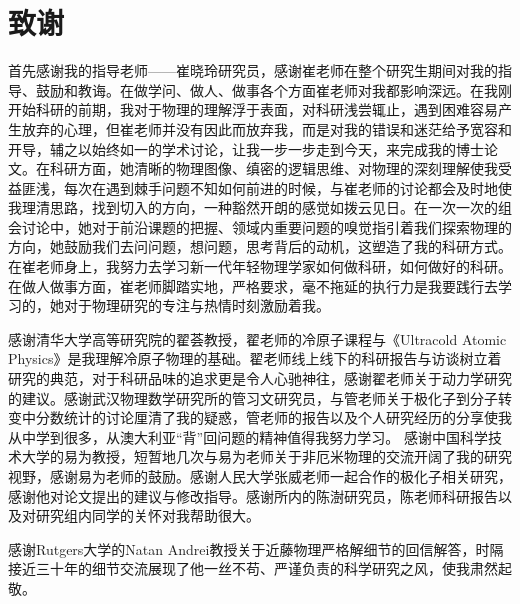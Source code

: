\chapter[致谢]{致\quad 谢}%

首先感谢我的指导老师——崔晓玲研究员，感谢崔老师在整个研究生期间对我的指导、鼓励和教诲。在做学问、做人、做事各个方面崔老师对我都影响深远。在我刚开始科研的前期，我对于物理的理解浮于表面，对科研浅尝辄止，遇到困难容易产生放弃的心理，但崔老师并没有因此而放弃我，而是对我的错误和迷茫给予宽容和开导，辅之以始终如一的学术讨论，让我一步一步走到今天，来完成我的博士论文。在科研方面，她清晰的物理图像、缜密的逻辑思维、对物理的深刻理解使我受益匪浅，每次在遇到棘手问题不知如何前进的时候，与崔老师的讨论都会及时地使我理清思路，找到切入的方向，一种豁然开朗的感觉如拨云见日。在一次一次的组会讨论中，她对于前沿课题的把握、领域内重要问题的嗅觉指引着我们探索物理的方向，她鼓励我们去问问题，想问题，思考背后的动机，这塑造了我的科研方式。在崔老师身上，我努力去学习新一代年轻物理学家如何做科研，如何做好的科研。在做人做事方面，崔老师脚踏实地，严格要求，毫不拖延的执行力是我要践行去学习的，她对于物理研究的专注与热情时刻激励着我。

感谢清华大学高等研究院的翟荟教授，翟老师的冷原子课程与《Ultracold Atomic Physics》是我理解冷原子物理的基础。翟老师线上线下的科研报告与访谈树立着研究的典范，对于科研品味的追求更是令人心驰神往，感谢翟老师关于动力学研究的建议。感谢武汉物理数学研究所的管习文研究员，与管老师关于极化子到分子转变中分数统计的讨论厘清了我的疑惑，管老师的报告以及个人研究经历的分享使我从中学到很多，从澳大利亚“背”回问题的精神值得我努力学习。 感谢中国科学技术大学的易为教授，短暂地几次与易为老师关于非厄米物理的交流开阔了我的研究视野，感谢易为老师的鼓励。感谢人民大学张威老师一起合作的极化子相关研究，感谢他对论文提出的建议与修改指导。感谢所内的陈澍研究员，陈老师科研报告以及对研究组内同学的关怀对我帮助很大。

感谢Rutgers大学的Natan Andrei教授关于近藤物理严格解细节的回信解答，时隔接近三十年的细节交流展现了他一丝不苟、严谨负责的科学研究之风，使我肃然起敬。

